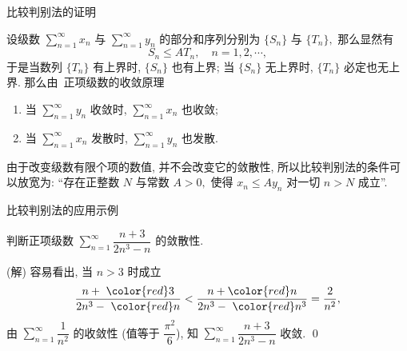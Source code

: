 
\begin{frame}{比较判别法的证明}

设级数 $\sum\limits_{n=1}^\infty x_n$ 与 $\sum\limits_{n=1}^\infty y_n$ 的部分和序列分别为 $\{S_n\}$ 与 $\{T_n\},$ 那么显然有
\[S_n \leqslant AT_n, \quad n = 1, 2 ,\cdots,\]
\pause
于是当数列 $\{T_n\}$ 有上界时, $\{S_n\}$ 也有上界; 当 $\{S_n\}$ 无上界时, $\{T_n\}$ 必定也无上界. 那么由~{\color{red}正项级数的收敛原理}

\pause


\pause
\vspace*{0.6em}

\begin{enumerate}
\item[(1)] 当 $\sum\limits_{n=1}^\infty y_n$ 收敛时, $\sum\limits_{n=1}^\infty x_n$ 也收敛;
\item[(2)] 当 $\sum\limits_{n=1}^\infty x_n$ 发散时, $\sum\limits_{n=1}^\infty y_n$ 也发散.
\end{enumerate}

\pause

\begin{attnblock}
由于改变级数有限个项的数值, 并不会改变它的敛散性, 所以比较判别法的条件可以放宽为: ``存在正整数 $N$ 与常数 $A>0,$ 使得 $x_n \leqslant Ay_n$ 对一切 $n > N$ 成立''.
\end{attnblock}

\end{frame}


\begin{frame}{比较判别法的应用示例}

\begin{eg}
\begin{center}
判断正项级数 $\sum\limits_{n=1}^\infty \dfrac{n+3}{2n^3-n}$ 的敛散性.
\end{center}
\end{eg}

\pause

\startproof[bg=yellow, fg=red](解)
容易看出, 当 $n > 3$ 时成立
\[\dfrac{n + ~{\color{red}3}}{2n^3 - ~ {\color{red}n}} < \dfrac{n+{\color{red}n}}{2n^3 - ~{\color{red}n^3}} = \dfrac{2}{n^2},\]
由 $\sum\limits_{n=1}^\infty \dfrac{1}{n^2}$ 的收敛性 (值等于 $\dfrac{\pi^2}{6}$), 知 $\sum\limits_{n=1}^\infty \dfrac{n+3}{2n^3-n}$ 收敛.
\qed

\end{frame}


